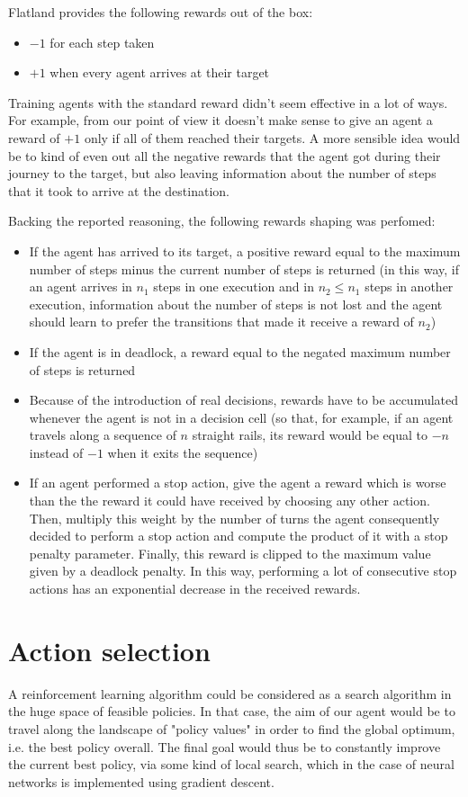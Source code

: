 \documentclass[a4paper,10pt]{report}
\begin{document}
Flatland provides the following rewards out of the box:
\begin{itemize}
	\item $-1$ for each step taken
	\item $+1$ when every agent arrives at their target
\end{itemize}

Training agents with the standard reward didn't seem effective in a lot of ways. For example, from our point of view it doesn't make sense to give an agent a reward of $+1$ only if all of them reached their targets. A more sensible idea would be to kind of even out all the negative rewards that the agent got during their journey to the target, but also leaving information about the number of steps that it took to arrive at the destination. 

Backing the reported reasoning, the following rewards shaping was perfomed:
\begin{itemize}
	\item If the agent has arrived to its target, a positive reward equal to the maximum number of steps minus the current number of steps is returned (in this way, if an agent arrives in $n_1$ steps in one execution and in $n_2\le n_1$ steps in another execution, information about the number of steps is not lost and the agent should learn to prefer the transitions that made it receive a reward of $n_2$)
	\item If the agent is in deadlock, a reward equal to the negated maximum number of steps is returned
	\item Because of the introduction of real decisions, rewards have to be accumulated whenever the agent is not in a decision cell (so that, for example, if an agent travels along a sequence of $n$ straight rails, its reward would be equal to $-n$ instead of $-1$ when it exits the sequence)
	\item If an agent performed a stop action, give the agent a reward which is worse than the the reward it could have received by choosing any other action. Then, multiply this weight by the number of turns the agent consequently decided to perform a stop action and compute the product of it with a stop penalty parameter. Finally, this reward is clipped to the maximum value given by a deadlock penalty. In this way, performing a lot of consecutive stop actions has an exponential decrease in the received rewards.
\end{itemize}

\section{Action selection}\label{sec:action-selection}
A reinforcement learning algorithm could be considered as a search algorithm in the huge space of feasible policies. In that case, the aim of our agent would be to travel along the landscape of "policy values" in order to find the global optimum, i.e. the best policy overall. The final goal would thus be to constantly improve the current best policy, via some kind of local search, which in the case of neural networks is implemented using gradient descent.
\end{document}
